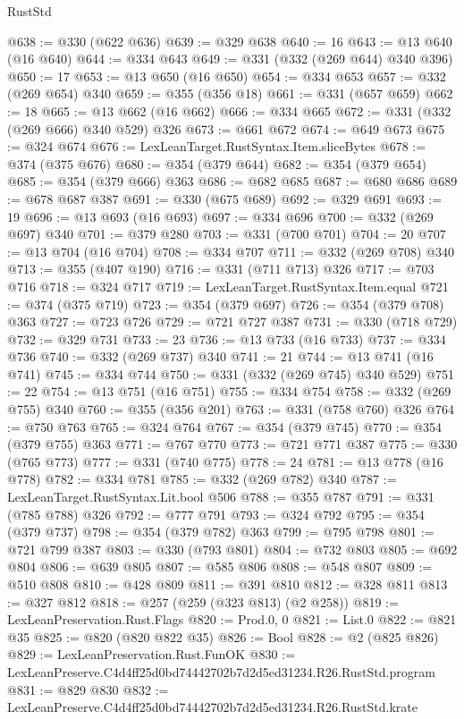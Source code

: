 \begin{lexlean}{RustStd}
\begin{coremodule}
@638 := @330 (@622 @636)
@639 := @329 @638
@640 := 16
@643 := @13 @640 (@16 @640)
@644 := @334 @643
@649 := @331 (@332 (@269 @644) @340 @396)
@650 := 17
@653 := @13 @650 (@16 @650)
@654 := @334 @653
@657 := @332 (@269 @654) @340
@659 := @355 (@356 @18)
@661 := @331 (@657 @659)
@662 := 18
@665 := @13 @662 (@16 @662)
@666 := @334 @665
@672 := @331 (@332 (@269 @666) @340 @529) @326
@673 := @661 @672
@674 := @649 @673
@675 := @324 @674
@676 := LexLeanTarget.RustSyntax.Item.sliceBytes
@678 := @374 (@375 @676)
@680 := @354 (@379 @644)
@682 := @354 (@379 @654)
@685 := @354 (@379 @666) @363
@686 := @682 @685
@687 := @680 @686
@689 := @678 @687 @387
@691 := @330 (@675 @689)
@692 := @329 @691
@693 := 19
@696 := @13 @693 (@16 @693)
@697 := @334 @696
@700 := @332 (@269 @697) @340
@701 := @379 @280
@703 := @331 (@700 @701)
@704 := 20
@707 := @13 @704 (@16 @704)
@708 := @334 @707
@711 := @332 (@269 @708) @340
@713 := @355 (@407 @190)
@716 := @331 (@711 @713) @326
@717 := @703 @716
@718 := @324 @717
@719 := LexLeanTarget.RustSyntax.Item.equal
@721 := @374 (@375 @719)
@723 := @354 (@379 @697)
@726 := @354 (@379 @708) @363
@727 := @723 @726
@729 := @721 @727 @387
@731 := @330 (@718 @729)
@732 := @329 @731
@733 := 23
@736 := @13 @733 (@16 @733)
@737 := @334 @736
@740 := @332 (@269 @737) @340
@741 := 21
@744 := @13 @741 (@16 @741)
@745 := @334 @744
@750 := @331 (@332 (@269 @745) @340 @529)
@751 := 22
@754 := @13 @751 (@16 @751)
@755 := @334 @754
@758 := @332 (@269 @755) @340
@760 := @355 (@356 @201)
@763 := @331 (@758 @760) @326
@764 := @750 @763
@765 := @324 @764
@767 := @354 (@379 @745)
@770 := @354 (@379 @755) @363
@771 := @767 @770
@773 := @721 @771 @387
@775 := @330 (@765 @773)
@777 := @331 (@740 @775)
@778 := 24
@781 := @13 @778 (@16 @778)
@782 := @334 @781
@785 := @332 (@269 @782) @340
@787 := LexLeanTarget.RustSyntax.Lit.bool @506
@788 := @355 @787
@791 := @331 (@785 @788) @326
@792 := @777 @791
@793 := @324 @792
@795 := @354 (@379 @737)
@798 := @354 (@379 @782) @363
@799 := @795 @798
@801 := @721 @799 @387
@803 := @330 (@793 @801)
@804 := @732 @803
@805 := @692 @804
@806 := @639 @805
@807 := @585 @806
@808 := @548 @807
@809 := @510 @808
@810 := @428 @809
@811 := @391 @810
@812 := @328 @811
@813 := @327 @812
@818 := @257 (@259 (@323 @813) (@2 @258))
@819 := LexLeanPreservation.Rust.Flags
@820 := Prod.{0, 0}
@821 := List.{0}
@822 := @821 @35
@825 := @820 (@820 @822 @35)
@826 := Bool
@828 := @2 (@825 @826)
@829 := LexLeanPreservation.Rust.FunOK
@830 := LexLeanPreserve.C4d4ff25d0bd74442702b7d2d5ed31234.R26.RustStd.program
@831 := @829 @830
@832 := LexLeanPreserve.C4d4ff25d0bd74442702b7d2d5ed31234.R26.RustStd.krate

\end{coremodule}
\end{lexlean}
